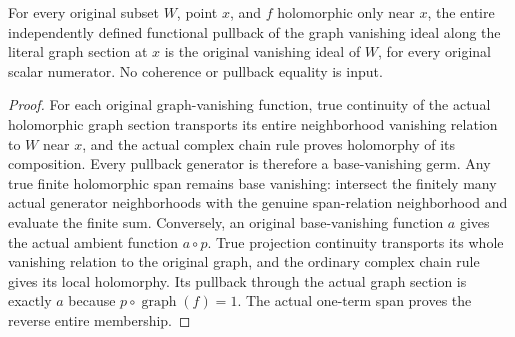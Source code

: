 \begin{theorem}
\label{hir:actual-graph-section-whole-ideal-pullback}
\leanok
For every original subset $W$, point $x$, and $f$ holomorphic only near
$x$, the entire independently defined functional pullback of the graph
vanishing ideal along the literal graph section at $x$ is the original
vanishing ideal of $W$, for every original scalar numerator. No coherence
or pullback equality is input.
\end{theorem}
\begin{proof}
For each original graph-vanishing function, true continuity of the actual
holomorphic graph section transports its entire neighborhood vanishing
relation to $W$ near $x$, and the actual complex chain rule proves
holomorphy of its composition. Every pullback generator is therefore a
base-vanishing germ. Any true finite holomorphic span remains base
vanishing: intersect the finitely many actual generator neighborhoods
with the genuine span-relation neighborhood and evaluate the finite sum.
Conversely, an original base-vanishing function $a$ gives the actual
ambient function $a\circ p$. True projection continuity transports its
whole vanishing relation to the original graph, and the ordinary complex
chain rule gives its local holomorphy. Its pullback through the actual
graph section is exactly $a$ because $p\circ\operatorname{graph}(f)=1$.
The actual one-term span proves the reverse entire membership.
\end{proof}

